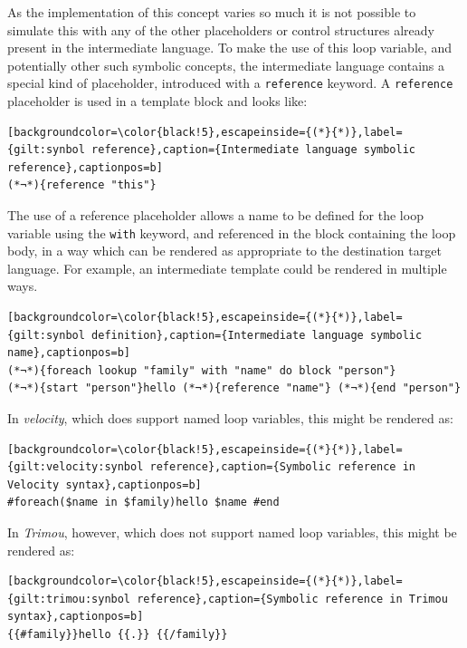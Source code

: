 As the implementation of this concept varies so much it is not possible to simulate this with any of the other placeholders or control structures already present in the intermediate language. To make the use of this loop variable, and potentially other such symbolic concepts, the intermediate language contains a special kind of placeholder, introduced with a \verb!reference! keyword. A \verb!reference! placeholder is used in a template block and looks like:

\begin{lstlisting}[backgroundcolor=\color{black!5},escapeinside={(*}{*)},label={gilt:synbol reference},caption={Intermediate language symbolic reference},captionpos=b]
(*¬*){reference "this"}
\end{lstlisting}

The use of a reference placeholder allows a name to be defined for the loop variable using the \verb!with! keyword, and referenced in the block containing the loop body, in a way which can be rendered as appropriate to the destination target language. For example, an intermediate template could be rendered in multiple ways.

\begin{lstlisting}[backgroundcolor=\color{black!5},escapeinside={(*}{*)},label={gilt:synbol definition},caption={Intermediate language symbolic name},captionpos=b]
(*¬*){foreach lookup "family" with "name" do block "person"}
(*¬*){start "person"}hello (*¬*){reference "name"} (*¬*){end "person"}
\end{lstlisting}

In \emph{velocity}, which does support named loop variables, this might be rendered as:

\begin{lstlisting}[backgroundcolor=\color{black!5},escapeinside={(*}{*)},label={gilt:velocity:synbol reference},caption={Symbolic reference in Velocity syntax},captionpos=b]
#foreach($name in $family)hello $name #end
\end{lstlisting}

In \emph{Trimou}, however, which does not support named loop variables, this might be rendered as:

\begin{lstlisting}[backgroundcolor=\color{black!5},escapeinside={(*}{*)},label={gilt:trimou:synbol reference},caption={Symbolic reference in Trimou syntax},captionpos=b]
{{#family}}hello {{.}} {{/family}}
\end{lstlisting}


